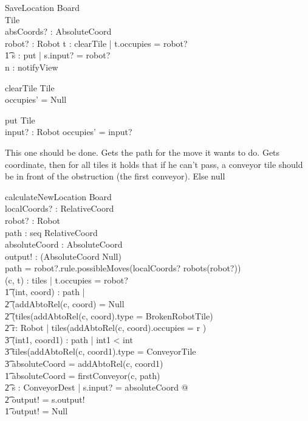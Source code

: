 \documentclass[a4paper,11pt]{article}
\begin{document}
\begin{schema}{SaveLocation}
\Xi Board \\
\Delta Tile \\
absCoords? : AbsoluteCoord \\
robot? : Robot
\where
\exists t : clearTile | t.occupies = robot?\\ \t1
\exists s : put | s.input? = robot? \\
\exists n : notifyView
\end{schema}

\begin{schema}{clearTile}
\Delta Tile \\
\where
occupies' = Null
\end{schema}

\begin{schema}{put}
\Delta Tile \\
input? : Robot
\where
occupies' = input?
\end{schema}

This one should be done. Gets the path for the move it wants to do. Gets coordinate, then for all tiles it holds that if he can't pass, a conveyor tile should be in front of the obstruction (the first conveyor). Else null
\begin{schema}{calculateNewLocation}
\Xi Board \\
localCoords? : RelativeCoord \\
robot? : Robot \\
path : seq RelativeCoord \\
absoluteCoord : AbsoluteCoord \\
output! : (AbsoluteCoord \union Null) \\
\where
path = robot?.rule.possibleMoves(localCoords? \cross robots(robot?)) \\
\exists (c, t) : tiles | t.occupies = robot? \implies \\ \t1
\IF
\forall (int, coord) : path | \\ \t2
(addAbtoRel(c, coord) = Null \vee \\ \t2
(tiles(addAbtoRel(c, coord).type = BrokenRobotTile) \vee \\ \t2
\exists r: Robot | tiles(addAbtoRel(c, coord).occupies = r )\implies \\ \t3
\exists (int1, coord1) : path | int1 < int \\ \t3
tiles(addAbtoRel(c, coord1).type = ConveyorTile \\ \t3
absoluteCoord = addAbtoRel(c, coord1) \\ \t1
\THEN absoluteCoord = firstConveyor(c, path) \\ \t2
\exists s : ConveyorDest | s.input? = absoluteCoord @ \\ \t2
output! = s.output! \\ \t1
\ELSE output! = Null
\end{schema}
\end{document}
